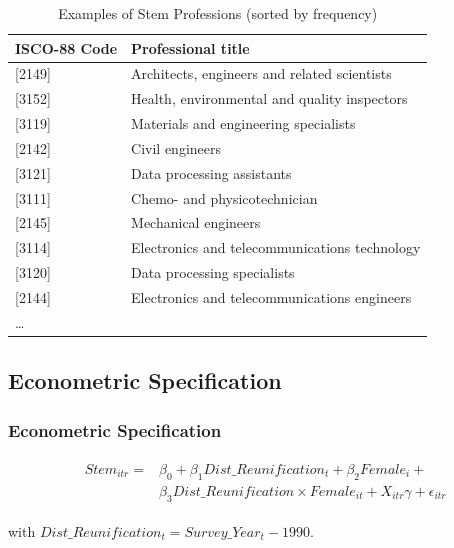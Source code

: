 \documentclass[11pt, aspectratio=1610, xcolor={dvipsnames}]{beamer}
\begin{document}
	\begin{frame}
		\frametitle{}
		
		{\small
			\begin{table}[h]
				\centering
				\caption{Examples of Stem Professions (sorted by frequency)}
				\label{tab:stem_examples}
	
				\begin{tabular}{l l}
					\toprule
					ISCO-88 Code & Professional title\\
					\midrule
					{[2149]} & Architects, engineers and related scientists \\
					{[3152]} & Health, environmental and quality inspectors\\
					{[3119]} & Materials and engineering specialists\\
					{[2142]} & Civil engineers\\
					{[3121]} & Data processing assistants\\
					{[3111]} & Chemo- and physicotechnician\\
					{[2145]} & Mechanical engineers\\
					{[3114]} & Electronics and telecommunications technology\\
					{[3120]} & Data processing specialists\\
					{[2144]} & Electronics and telecommunications engineers\\
					… &\\
					\bottomrule
				\end{tabular}
			\end{table}
		}
		
	\end{frame}
	
	\subsection{Econometric Specification}
	\begin{frame}
		\frametitle{Econometric Specification}
		
			{\normalsize
				\begin{align}
					&\begin{aligned}
						\label{eq:spec}
						Stem_{itr} =& \beta_{0} + \beta_{1} Dist\_Reunification_{t} + \beta_{2} Female_{i} +\\
						&\beta_{3} Dist\_Reunification \times Female_{it} + X_{itr} \gamma + \epsilon_{itr}
					\end{aligned}
				\end{align}
				
				\vspace{1cm}
				
				\hspace{6.2em} with $Dist\_Reunification_{t} = Survey\_Year_{t} - 1990$.
			}
		
	\end{frame}
	
\end{document}
